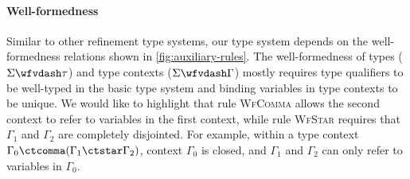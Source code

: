 \paragraph{Well-formedness} Similar to other refinement type systems, our type system depends on the well-formedness relations shown in
\autoref{fig:auxiliary-rules}. The well-formedness of types ($\Sigma
\wfvdash \tau$) and type contexts ($\Sigma \wfvdash \Gamma$) mostly
requires type qualifiers to be well-typed in the basic type system and
binding variables in type contexts to be unique. We would like to
highlight that rule \textsc{WfComma} allows the second context to
refer to variables in the first context, while rule \textsc{WfStar}
requires that $\Gamma_1$ and $\Gamma_2$ are completely disjointed. For
example, within a type context $\Gamma_0 \ctcomma (\Gamma_1 \ctstar
\Gamma_2)$, context $\Gamma_0$ is closed, and $\Gamma_1$ and
$\Gamma_2$ can only refer to variables in $\Gamma_0$.


